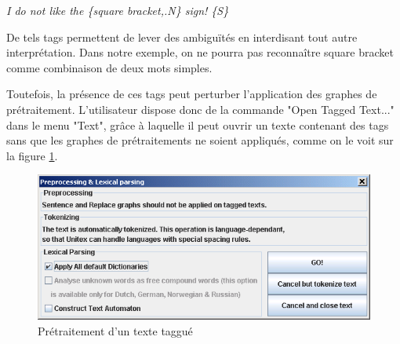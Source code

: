 \bigskip
\textit{I do not like the \{square bracket,.N\} sign! \{S\}}

\bigskip
\noindent De tels tags permettent de lever des ambiguïtés en interdisant tout autre interprétation.
Dans notre exemple, on ne pourra pas reconnaître square bracket comme combinaison de deux mots
simples.


\bigskip
\noindent Toutefois, la présence de ces tags peut perturber l’application des graphes de
prétraitement. L’utilisateur dispose donc de la commande "Open Tagged Text..." dans le menu "Text",
grâce à laquelle il peut ouvrir un texte contenant des tags sans que les graphes de prétraitements
ne soient appliqués, comme on le voit sur la figure \ref{preprocess-tagged-text}.

\bigskip
\begin{figure}[!h]
\begin{center}
\includegraphics[width=14cm]{resources/img/fig2-15.png}
\caption{Prétraitement d’un texte taggué\label{preprocess-tagged-text}}
\end{center}
\end{figure}

